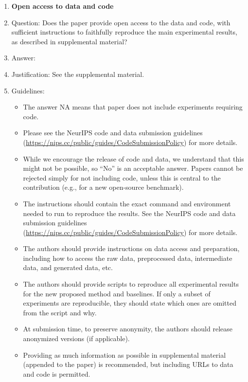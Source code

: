 \documentclass{article}
\theoremstyle{plain}
\theoremstyle{definition}
\theoremstyle{remark}
\begin{document}
\begin{enumerate}
\item {\bf Open access to data and code}
    \item[] Question: Does the paper provide open access to the data and code, with sufficient instructions to faithfully reproduce the main experimental results, as described in supplemental material?
    \item[] Answer: \answerYes{} %
    \item[] Justification: See the supplemental material.
    \item[] Guidelines:
    \begin{itemize}
        \item The answer NA means that paper does not include experiments requiring code.
        \item Please see the NeurIPS code and data submission guidelines (\url{https://nips.cc/public/guides/CodeSubmissionPolicy}) for more details.
        \item While we encourage the release of code and data, we understand that this might not be possible, so “No” is an acceptable answer. Papers cannot be rejected simply for not including code, unless this is central to the contribution (e.g., for a new open-source benchmark).
        \item The instructions should contain the exact command and environment needed to run to reproduce the results. See the NeurIPS code and data submission guidelines (\url{https://nips.cc/public/guides/CodeSubmissionPolicy}) for more details.
        \item The authors should provide instructions on data access and preparation, including how to access the raw data, preprocessed data, intermediate data, and generated data, etc.
        \item The authors should provide scripts to reproduce all experimental results for the new proposed method and baselines. If only a subset of experiments are reproducible, they should state which ones are omitted from the script and why.
        \item At submission time, to preserve anonymity, the authors should release anonymized versions (if applicable).
        \item Providing as much information as possible in supplemental material (appended to the paper) is recommended, but including URLs to data and code is permitted.
    \end{itemize}



\end{enumerate}
\end{document}
